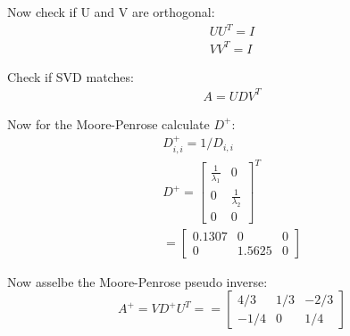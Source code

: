 \documentclass[../Main.tex]{subfiles}
\begin{document}
{    Now check if U and V are orthogonal:
    \begin{equation*}
        \begin{split}
            UU^T = I \\
            VV^T = I
        \end{split}
    \end{equation*}

    Check if SVD matches:
    \begin{eqnarray*}
        A = UDV^T
    \end{eqnarray*}

    Now for the Moore-Penrose calculate \(D^+\):
    \begin{equation*}
        \begin{split}
            D_{i,i}^+ = 1/D_{i,i} \\
            D^+ = \begin{bmatrix}
                \frac{1}{\lambda_1} & 0\\
                0 & \frac{1}{\lambda_2}\\
                0 & 0
            \end{bmatrix}^T \\
            = \begin{bmatrix}
                0.1307 & 0 & 0 \\
                0 & 1.5625 & 0
            \end{bmatrix}
        \end{split}
    \end{equation*}

    Now asselbe the Moore-Penrose pseudo inverse:
    \begin{equation*}
        A^+ = VD^+ U^T = = \begin{bmatrix}
           4/3 & 1/3 & -2/3 \\
            -1/4 & 0 & 1/4
        \end{bmatrix}
    \end{equation*}

}
\end{document}
